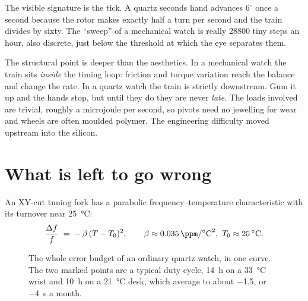 \documentclass[11pt,a4paper]{article}
\begin{document}
The visible signature is the tick. A quartz seconds hand advances $6^\circ$ once a second
because the rotor makes exactly half a turn per second and the train divides by sixty. The
``sweep'' of a mechanical watch is really \num{28800} tiny steps an hour, also discrete, just
below the threshold at which the eye separates them.

The structural point is deeper than the aesthetics. In a mechanical watch the train sits
\emph{inside} the timing loop: friction and torque variation reach the balance and change the
rate. In a quartz watch the train is strictly downstream. Gum it up and the hands stop, but
until they do they are never \emph{late}. The loads involved are trivial, roughly a microjoule
per second, so pivots need no jewelling for wear and wheels are often moulded polymer. The
engineering difficulty moved upstream into the silicon.

\section{What is left to go wrong}

An XY-cut tuning fork has a parabolic frequency--temperature characteristic with its turnover
near \SI{25}{\celsius}:
\begin{equation}
\frac{\Delta f}{f} \;=\; -\,\beta\,(T - T_0)^2 ,
\qquad \beta \approx \SI{0.035}{\ppm\per\celsius\squared},\ T_0 \approx \SI{25}{\celsius}.
\label{eq:parab}
\end{equation}

\begin{figure}[htbp]
\centering
{}
\caption{The whole error budget of an ordinary quartz watch, in one curve. The two marked
points are a typical duty cycle, \SI{14}{\hour} on a \SI{33}{\celsius} wrist and
\SI{10}{\hour} on a \SI{21}{\celsius} desk, which average to about \SI{-1.5}{\ppm}, or
\SI{-4}{\second} a month.}
\end{figure}
\end{document}
